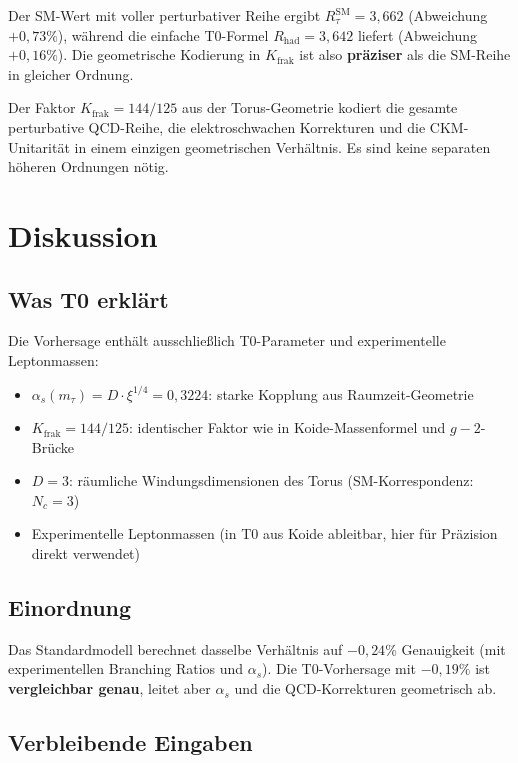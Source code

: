 	Der SM-Wert mit voller perturbativer Reihe ergibt $R_\tau^\text{SM} = 3{,}662$ (Abweichung $+0{,}73\%$), während die einfache T0-Formel $R_\text{had} = 3{,}642$ liefert (Abweichung $+0{,}16\%$). Die geometrische Kodierung in $K_\text{frak}$ ist also \textbf{präziser} als die SM-Reihe in gleicher Ordnung.
	
	\begin{keypoint}
		Der Faktor $K_\text{frak} = 144/125$ aus der Torus-Geometrie kodiert die gesamte perturbative QCD-Reihe, die elektroschwachen Korrekturen und die CKM-Unitarität in einem einzigen geometrischen Verhältnis. Es sind keine separaten höheren Ordnungen nötig.
	\end{keypoint}
	
	
	\section{Diskussion}
	
	\subsection{Was T0 erklärt}
	
	Die Vorhersage enthält ausschließlich T0-Parameter und experimentelle Leptonmassen:
	\begin{itemize}
		\item $\alpha_s(m_\tau) = D \cdot \xi^{1/4} = 0{,}3224$: starke Kopplung aus Raumzeit-Geometrie
		\item $K_\text{frak} = 144/125$: identischer Faktor wie in Koide-Massenformel und $g-2$-Brücke
		\item $D = 3$: räumliche Windungsdimensionen des Torus (SM-Korrespondenz: $N_c=3$)
		\item Experimentelle Leptonmassen (in T0 aus Koide ableitbar, hier für Präzision direkt verwendet)
	\end{itemize}
	
	\subsection{Einordnung}
	
	Das Standardmodell berechnet dasselbe Verhältnis auf $-0{,}24\%$ Genauigkeit (mit experimentellen Branching Ratios und $\alpha_s$). Die T0-Vorhersage mit $-0{,}19\%$ ist \textbf{vergleichbar genau}, leitet aber $\alpha_s$ und die QCD-Korrekturen geometrisch ab.
	
	\subsection{Verbleibende Eingaben}
	
